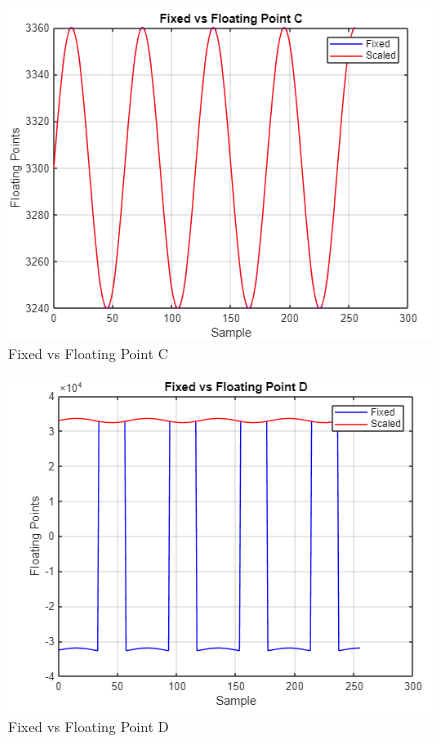 \documentclass[journal]{IEEEtran}
\begin{document}
\begin{figure}[H]
    \centering
    \includegraphics[width=\linewidth]{2.3.png}
    \caption{Fixed vs Floating Point C}
    \vspace{1em} %
    \label{fig:part2C}
\end{figure}

\begin{figure}[H]
    \centering
    \includegraphics[width=\linewidth]{2.4.png}
    \caption{Fixed vs Floating Point D}
    \label{fig:part2D}
\end{figure}
\end{document}

